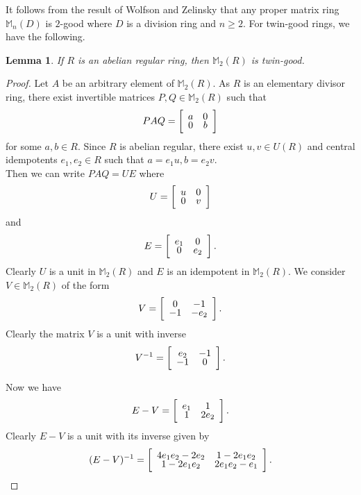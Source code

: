 \documentclass{amsart}
\newtheorem{lemma}[theorem]{Lemma}
\begin{document}
It follows from the result of Wolfson and Zelinsky that any proper matrix ring $\mathbb M_n(D)$ is $2$-good where $D$ is a division ring and $n\ge 2$. For twin-good rings, we have the following.

\begin{lemma} \label{abelian}
If $R$ is an abelian regular ring, then $\mathbb M_2(R)$ is twin-good.
\end{lemma}

\begin{proof}
Let $A$ be an arbitrary element of $\mathbb M_{2}(R)$. As $R$ is an elementary divisor ring, there exist invertible matrices $P, Q\in \mathbb M_{2}(R)$ such that \[PAQ=\left[
\begin{array}{cc}
a & 0 \\
\noalign{\vspace{-0.3em}}
0 & b
\end{array}
\right] \]
for some $a, b\in R$. Since $R$ is abelian regular, there exist $u,v \in U(R)$ and central idempotents $e_{1},e_{2}\in R$ such that $a = e_{1}u , b = e_{2}v$. \\
Then we can write  $PAQ= UE$ where  
\[U=\left[
\begin{array}{cc}
u & 0 \\
\noalign{\vspace{-0.3em}}
0 & v
\end{array}
\right] \]  and \[E=\left[
\begin{array}{cc}
e_{1} & 0 \\
\noalign{\vspace{-0.3em}}
0 & e_{2}
\end{array} 
\right] .\] 
Clearly $U$ is a unit in $\mathbb M_2(R)$ and $E$ is an idempotent in $\mathbb M_2(R)$. We consider $V\in \mathbb M_2(R)$ of the form \[V=\left[
\begin{array}{cc}
0 & -1 \\
\noalign{\vspace{-0.3em}}
-1 & -e_{2}
\end{array}
\right] .\] 
Clearly the matrix $V$ is a unit with inverse \[V^{-1}=\left[
\begin{array}{cc}
e_2 & -1 \\
\noalign{\vspace{-0.3em}}
-1 & 0
\end{array}
\right] .\] 
 
\noindent Now we have \[E-V=\left[
\begin{array}{cc}
e_{1} & 1 \\
\noalign{\vspace{-0.3em}}
1 & 2e_{2}
\end{array}
\right] .\] Clearly $E-V$ is a unit with its inverse given by 
\[(E-V)^{-1}=\left[
\begin{array}{cc}
4e_{1}e_{2}-2e_{2} & 1-2e_{1}e_{2} \\
\noalign{\vspace{-0.3em}}
1-2e_{1}e_{2} & 2e_{1}e_{2}-e_{1}
\end{array}
\right]. \] 


\end{proof}
\end{document}
